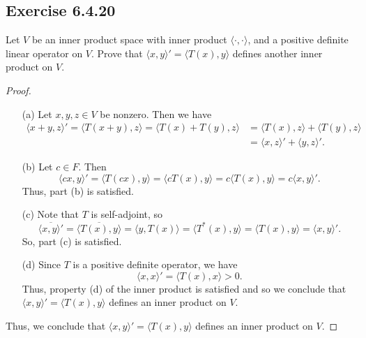 \subsection*{Exercise 6.4.20} Let \( V  \) be an inner product space with inner product \( \langle \cdot , \cdot \rangle \), and a positive definite linear operator on \( V  \). Prove that \( \langle x , y \rangle' = \langle T(x) , y \rangle \) defines another inner product on \( V  \).
\begin{proof}
   \begin{enumerate}
       \item[(a)] Let \( x,y,z \in V  \) be nonzero. Then we have
           \begin{align*}
               \langle x+y , z  \rangle' = \langle T(x+y) , z \rangle = \langle T(x) + T(y) , z \rangle &= \langle T(x) , z \rangle + \langle T(y) , z \rangle  \\
                                                                            &= \langle x , z \rangle' + \langle y , z \rangle'.
    \end{align*}
    \item[(b)] Let \( c \in F  \). Then
        \[  \langle cx , y \rangle' = \langle T(cx) , y \rangle = \langle cT(x) , y \rangle = c \langle T(x) , y \rangle = c \langle x , y \rangle'.  \]
        Thus, part (b) is satisfied. 
    \item[(c)] Note that \( T  \) is self-adjoint, so 
        \[  \overline{\langle x , y \rangle'} = \overline{\langle T(x) , y \rangle} = \langle y , T(x) \rangle = \langle T^{*}(x) , y \rangle = \langle T(x) , y \rangle = \langle x , y \rangle'.  \]
        So, part (c) is satisfied.
    \item[(d)] Since \( T  \) is a positive definite operator, we have \[ \langle x , x \rangle' = \langle T(x) , x \rangle > 0.  \]
    Thus, property (d) of the inner product is satisfied and so we conclude that \( \langle x , y \rangle' = \langle T(x) , y \rangle  \) defines an inner product on \( V  \).
\end{enumerate}  
Thus, we conclude that \( \langle x , y \rangle' = \langle T(x) , y \rangle \) defines an inner product on \( V  \). 
\end{proof}

